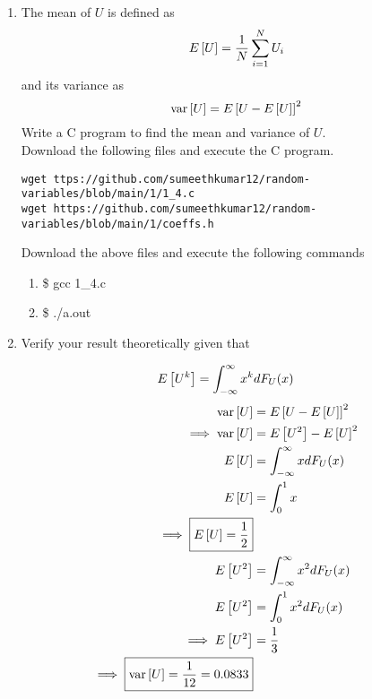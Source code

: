 \documentclass[journal,12pt,twocolumn]{IEEEtran}
\begin{document}
\begin{enumerate}[label=\thesection.\arabic*
,ref=\thesection.\theenumi]
\begin{align}
\implies {F_U(x)=x  }
\end{align}
\item
The mean of $U$ is defined as
%
\begin{equation}
E{}\left[U\right] = \frac{1}{N}\sum_{i=1}^{N}U_i
\end{equation}
%
and its variance as
%
\begin{equation}
\text{var}{}\left[U\right] = E{}\left[U- E{}\left[U\right]\right]^2 
\end{equation}
Write a C program to  find the mean and variance of $U$. \\
\solution Download the following files and execute the  C program.
\begin{lstlisting}
wget ttps://github.com/sumeethkumar12/random-variables/blob/main/1/1_4.c
wget https://github.com/sumeethkumar12/random-variables/blob/main/1/coeffs.h
\end{lstlisting}
Download the above files and execute the following commands
\begin{enumerate}
    \item \$ gcc 1\_4.c
    \item \$ ./a.out
    \end{enumerate}
\item Verify your result theoretically given that
\end{enumerate}
%
\begin{equation}
E{}\left[U^k\right] = \int_{-\infty}^{\infty}x^kdF_{U}(x)
\end{equation}
\solution 
\begin{align}
    \text{var}{}\left[U\right] &= E{}\left[U- E{}\left[U\right]\right]^2\\ 
    \implies \text{var}{}\left[U\right] &= E{}\left[U^2\right]- E{}\left[U\right]^2 \\
    E{}\left[U\right]&=\int_{-\infty}^{\infty}xdF_U(x)\\
    E{}\left[U\right]&=\int_{0}^{1}x\\
    \implies \boxed{E{}\left[U\right]=\frac{1}{2}}\\
    E{}\left[U^2\right]&=\int_{-\infty}^{\infty}x^{2}dF_U(x)\\
    E{}\left[U^2\right]&=\int_{0}^{1}x^{2}dF_U(x)\\
    \implies E{}\left[U^2\right]&=\frac{1}{3}\\
    \implies \boxed{\text{var}{}\left[U\right]=\frac{1}{12}=0.0833}
\end{align}
\end{document}
